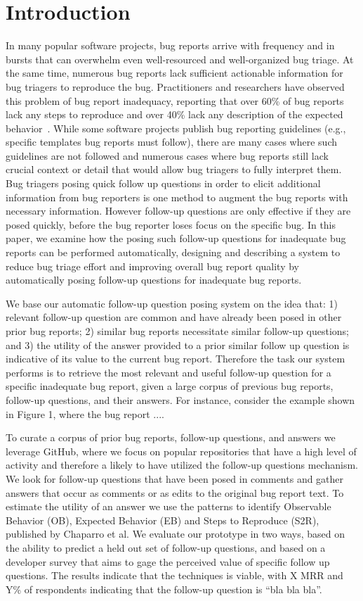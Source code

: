 \section{Introduction}

In many popular software projects, bug reports arrive with frequency and in bursts that can overwhelm even well-resourced and well-organized bug triage.
%
At the same time, numerous bug reports lack sufficient actionable information for bug triagers to reproduce the bug.
%
Practitioners and researchers have observed this problem of bug report inadequacy, reporting that over 60\% of bug reports lack any steps to reproduce and over 40\% lack any description of the expected behavior~\cite{chaparro17detecting}.
%
While some software projects publish bug reporting guidelines (e.g., specific templates bug reports must follow), there are many cases where such guidelines are not followed and numerous cases where bug reports still lack crucial context or detail that would allow bug triagers to fully interpret them.
%
Bug triagers posing quick follow up questions in order to elicit additional information from bug reporters is one method to augment the bug reports with necessary information.
%
However follow-up questions are only effective if they are posed quickly, before the bug reporter loses focus on the specific bug.
%
In this paper, we examine how the posing such follow-up questions for inadequate bug reports can be performed automatically, designing and describing a system to reduce bug triage effort and improving overall bug report quality by automatically posing follow-up questions for inadequate bug reports.

%
We base our automatic follow-up question posing system on the idea that: 1) relevant follow-up question are common and have already been posed in other prior bug reports; 2) similar bug reports necessitate similar follow-up questions; and 3) the utility of the answer provided to a prior similar follow up question is indicative of its value to the current bug report.
%
Therefore the task our system performs is to retrieve the most relevant and useful follow-up question for a specific inadequate bug report, given a large corpus of previous bug reports, follow-up questions, and their answers.
%
For instance, consider the example shown in Figure 1, where the bug report ....

To curate a corpus of prior bug reports, follow-up questions, and answers we leverage GitHub, where we focus on popular repositories that have a high level of activity and therefore a likely to have utilized the follow-up questions mechanism. We look for follow-up questions that have been posed in comments and gather answers that occur as comments or as edits to the original bug report text. To estimate the utility of an answer we use the patterns to identify Observable Behavior (OB), Expected Behavior (EB) and Steps to Reproduce (S2R), published by Chaparro et al. We evaluate our prototype in two ways, based on the ability to predict a held out set of follow-up questions, and based on a developer survey that aims to gage the perceived value of specific follow up questions. The results indicate that the techniques is viable, with X MRR and Y\% of respondents indicating that the follow-up question is “bla bla bla”.

